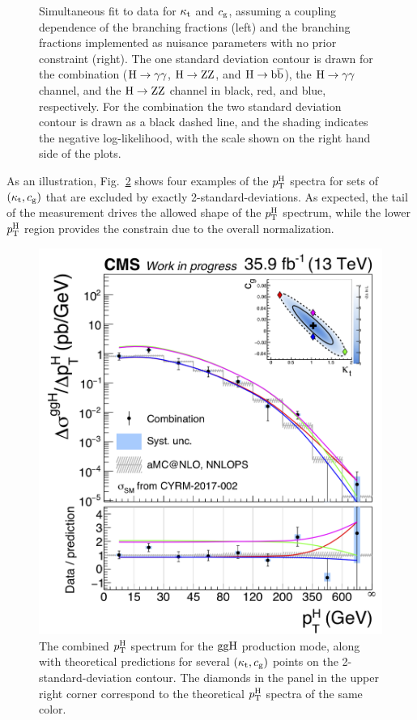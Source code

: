 \begin{figure}[hbtp]
\begin{center}
{        }
    \caption{
        Simultaneous fit to data for $\kappa_{\mathrm{t}}$ and $c_\mathrm{g}$, assuming a coupling dependence of the branching fractions (left) and the branching fractions implemented as nuisance parameters with no prior constraint (right).
        The one standard deviation contour is drawn for the combination ($\mathrm{H}\to\mathrm{\gamma}\mathrm{\gamma}$, $\mathrm{H}\to\mathrm{Z}\mathrm{Z}$, and $\mathrm{H}\to\mathrm{b}\overline{\mathrm{b}}$), the $\mathrm{H}\to\mathrm{\gamma}\mathrm{\gamma}$ channel, and the $\mathrm{H}\to\mathrm{Z}\mathrm{Z}$ channel in black, red, and blue, respectively.
        For the combination the two standard deviation contour is drawn as a black dashed line, and the shading indicates the negative log-likelihood, with the scale shown on the right hand side of the plots.
        }
    \label{fig:ktcg}
  \end{center}
\end{figure}


As an illustration, Fig.~\ref{fig:ktcg-points} shows four examples of the $p_\mathrm{T}^\mathrm{H}$ spectra for sets of $(\kappa_{\mathrm{t}}, c_\mathrm{g})$ that are excluded by exactly 2-standard-deviations.
% 
As expected, the tail of the measurement drives the allowed shape of the $p_\mathrm{T}^\mathrm{H}$ spectrum, while the lower $p_\mathrm{T}^\mathrm{H}$ region provides the constrain due to the overall normalization.


\begin{figure}[hbtp]
  \begin{center}
    \includegraphics[width=0.55\linewidth]{img/interpretation/spectra_pth_ggH_withmulticont.png}
    \caption{
        The combined $p_\mathrm{T}^\mathrm{H}$ spectrum for the $\mathrm{g}\mathrm{g}\mathrm{H}$ production mode, along with theoretical predictions for several $(\kappa_{\mathrm{t}}, c_\mathrm{g})$ points on the 2-standard-deviation contour.
        The diamonds in the panel in the upper right corner correspond to the theoretical $p_\mathrm{T}^\mathrm{H}$ spectra of the same color.
        }
    \label{fig:ktcg-points}
  \end{center}
\end{figure}


